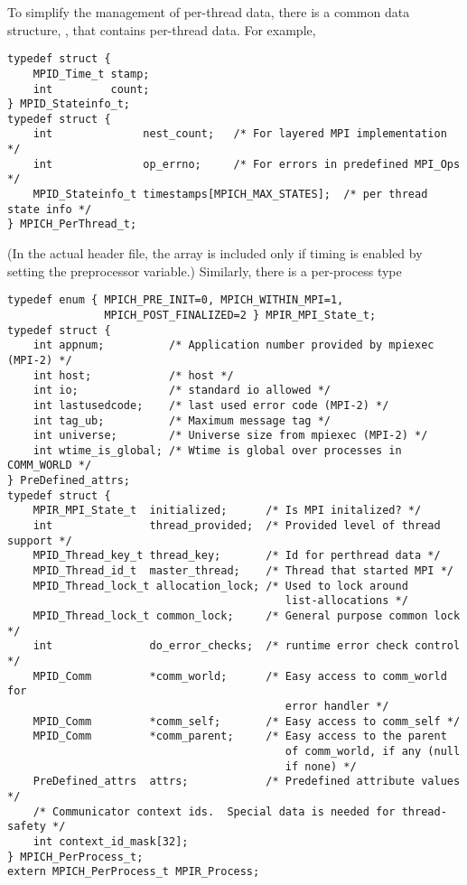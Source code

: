 \documentclass{article}
\begin{document}
To simplify the management of per-thread data, there is a common data
structure, , that contains per-thread data.
For example,
% 
\begin{verbatim}
typedef struct {
    MPID_Time_t stamp;
    int         count;
} MPID_Stateinfo_t;
typedef struct {
    int              nest_count;   /* For layered MPI implementation */
    int              op_errno;     /* For errors in predefined MPI_Ops */
    MPID_Stateinfo_t timestamps[MPICH_MAX_STATES];  /* per thread state info */
} MPICH_PerThread_t;
\end{verbatim}
(In the actual  header file, the 
array is included only if timing is enabled by setting the
 preprocessor variable.)
Similarly, there is a per-process type
\begin{verbatim}
typedef enum { MPICH_PRE_INIT=0, MPICH_WITHIN_MPI=1,
               MPICH_POST_FINALIZED=2 } MPIR_MPI_State_t;
typedef struct {
    int appnum;          /* Application number provided by mpiexec (MPI-2) */
    int host;            /* host */
    int io;              /* standard io allowed */
    int lastusedcode;    /* last used error code (MPI-2) */
    int tag_ub;          /* Maximum message tag */
    int universe;        /* Universe size from mpiexec (MPI-2) */
    int wtime_is_global; /* Wtime is global over processes in COMM_WORLD */
} PreDefined_attrs;
typedef struct {
    MPIR_MPI_State_t  initialized;      /* Is MPI initalized? */
    int               thread_provided;  /* Provided level of thread support */
    MPID_Thread_key_t thread_key;       /* Id for perthread data */
    MPID_Thread_id_t  master_thread;    /* Thread that started MPI */
    MPID_Thread_lock_t allocation_lock; /* Used to lock around 
                                           list-allocations */
    MPID_Thread_lock_t common_lock;     /* General purpose common lock */
    int               do_error_checks;  /* runtime error check control */
    MPID_Comm         *comm_world;      /* Easy access to comm_world for
                                           error handler */
    MPID_Comm         *comm_self;       /* Easy access to comm_self */
    MPID_Comm         *comm_parent;     /* Easy access to the parent
                                           of comm_world, if any (null
                                           if none) */
    PreDefined_attrs  attrs;            /* Predefined attribute values */
    /* Communicator context ids.  Special data is needed for thread-safety */
    int context_id_mask[32];
} MPICH_PerProcess_t;
extern MPICH_PerProcess_t MPIR_Process;
\end{verbatim}
\end{document}
